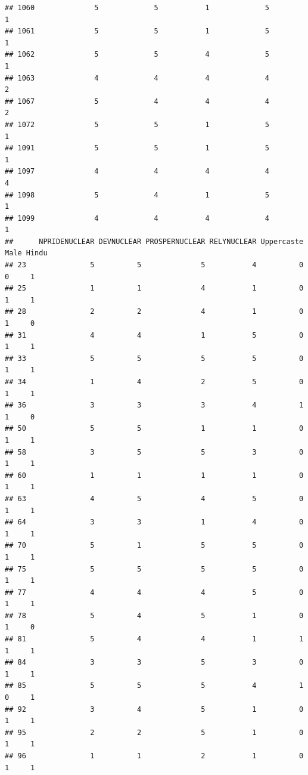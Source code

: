 \documentclass[
]{article}
\begin{document}
\begin{verbatim}
## 1060              5             5           1             5            1
## 1061              5             5           1             5            1
## 1062              5             5           4             5            1
## 1063              4             4           4             4            2
## 1067              5             4           4             4            2
## 1072              5             5           1             5            1
## 1091              5             5           1             5            1
## 1097              4             4           4             4            4
## 1098              5             4           1             5            1
## 1099              4             4           4             4            1
##      NPRIDENUCLEAR DEVNUCLEAR PROSPERNUCLEAR RELYNUCLEAR Uppercaste Male Hindu
## 23               5          5              5           4          0    0     1
## 25               1          1              4           1          0    1     1
## 28               2          2              4           1          0    1     0
## 31               4          4              1           5          0    1     1
## 33               5          5              5           5          0    1     1
## 34               1          4              2           5          0    1     1
## 36               3          3              3           4          1    1     0
## 50               5          5              1           1          0    1     1
## 58               3          5              5           3          0    1     1
## 60               1          1              1           1          0    1     1
## 63               4          5              4           5          0    1     1
## 64               3          3              1           4          0    1     1
## 70               5          1              5           5          0    1     1
## 75               5          5              5           5          0    1     1
## 77               4          4              4           5          0    1     1
## 78               5          4              5           1          0    1     0
## 81               5          4              4           1          1    1     1
## 84               3          3              5           3          0    1     1
## 85               5          5              5           4          1    0     1
## 92               3          4              5           1          0    1     1
## 95               2          2              5           1          0    1     1
## 96               1          1              2           1          0    1     1

\end{verbatim}
\end{document}
